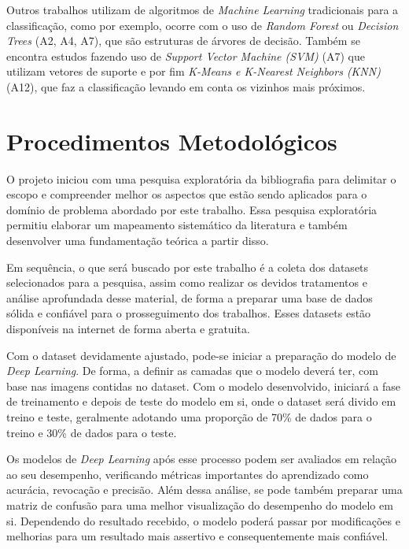 Outros trabalhos utilizam de algoritmos de \emph{Machine Learning} tradicionais para a classificação, como por exemplo, ocorre com o uso de \emph{Random Forest} ou \emph{Decision Trees}  (A2, A4, A7), que são estruturas de árvores de decisão. Também se encontra estudos fazendo uso de \emph{Support Vector Machine (SVM)} (A7) que utilizam vetores de suporte e por fim \emph{K-Means e K-Nearest Neighbors (KNN)} (A12), que faz a classificação levando em conta os vizinhos mais próximos.

\chapter{Procedimentos Metodológicos}
\label{chap:metodologia}


O projeto iniciou com uma pesquisa exploratória da bibliografia para delimitar o escopo e compreender melhor os aspectos que estão sendo aplicados para o domínio de problema abordado por este trabalho. Essa pesquisa exploratória permitiu elaborar um mapeamento sistemático da literatura e também desenvolver uma fundamentação teórica a partir disso.

Em sequência, o que será buscado por este trabalho é a coleta dos datasets selecionados para a pesquisa, assim como realizar os devidos tratamentos e análise aprofundada desse material, de forma a preparar uma base de dados sólida e confiável para o prosseguimento dos trabalhos. Esses datasets estão disponíveis na internet de forma aberta e gratuita.

Com o dataset devidamente ajustado, pode-se iniciar a preparação do modelo de \emph{Deep Learning}. De forma, a definir as camadas que o modelo deverá ter, com base nas imagens contidas no dataset. Com o modelo desenvolvido, iniciará a fase de treinamento e depois de teste do modelo em si, onde o dataset será divido em treino e teste, geralmente adotando uma proporção de 70\% de dados para o treino e 30\% de dados para o teste.

Os modelos de \emph{Deep Learning} após esse processo podem ser avaliados em relação ao seu desempenho, verificando métricas importantes do aprendizado como acurácia, revocação e precisão. Além dessa análise, se pode também preparar uma matriz de confusão para uma melhor visualização do desempenho do modelo em si. Dependendo do resultado recebido, o modelo poderá passar por modificações e melhorias para um resultado mais assertivo e consequentemente mais confiável.

